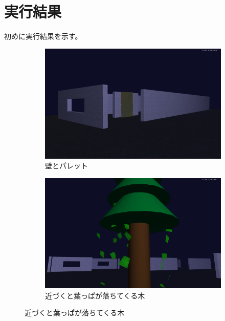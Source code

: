 \documentclass[upIatex,dvipdfmx,a4paper]{jsarticle}
\begin{document}
\section{実行結果}
初めに実行結果を示す。
\begin{figure}[H]
    \centering
    \begin{subfigure}[b]{0.48\linewidth}
        \includegraphics[width=\linewidth]{result1.png}
        \caption{壁とパレット}
        \label{fig:result1}
    \end{subfigure}
    \hfill
    \begin{subfigure}[b]{0.48\linewidth}
        \includegraphics[width=\linewidth]{result2.png}
        \caption{近づくと葉っぱが落ちてくる木}
        \label{fig:result2}
    \end{subfigure}

    \vspace{4mm}


\end{figure}
\end{document}
